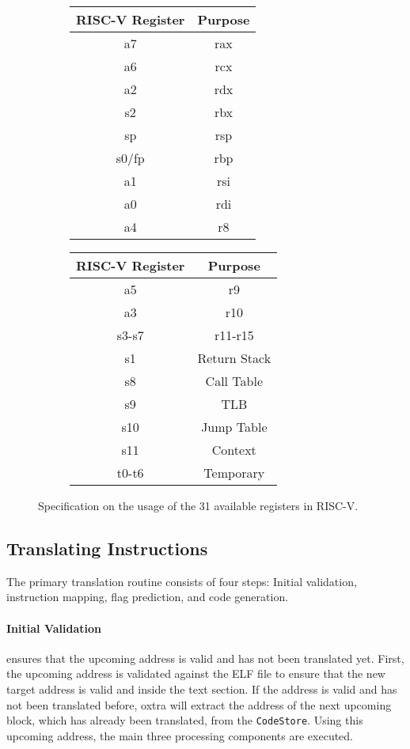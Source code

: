 \begin{figure}[H]
	\centering
	\begin{subfigure}[b]{.5\textwidth}
		\centering
		\begin{tabular}{|c|c|} 
			\hline
			\textbf{RISC-V Register} & \textbf{Purpose}\\
			\hline
			a7 & rax \\
			a6 & rcx\\
			a2 & rdx \\
			s2 & rbx \\
			sp & rsp \\
			s0/fp & rbp \\
			a1 & rsi \\
			a0 & rdi \\
			a4 & r8 \\
			\hline
		\end{tabular}
	\end{subfigure}%
	\begin{subfigure}[b]{.5\textwidth}
		\centering
		\begin{tabular}{|c|c|} 
			\hline
			\textbf{RISC-V Register} & \textbf{Purpose}\\
			\hline
			a5 & r9 \\
			a3 & r10 \\
			s3-s7 & r11-r15 \\
			s1 & Return Stack \\
			s8 & Call Table \\
			s9 & TLB \\
			s10 & Jump Table \\
			s11 & Context \\
			t0-t6 & Temporary \\
			\hline
		\end{tabular}
	\end{subfigure}
	\caption[Register Mapping]{Specification on the usage of the 31 available registers in RISC-V.}
	\label{fig:register-mapping}
\end{figure}

\subsection{Translating Instructions}
	The primary translation routine consists of four steps: Initial validation, instruction mapping, flag prediction, and code generation.
	
	\paragraph{Initial Validation} ensures that the upcoming address is valid and has not been translated yet. First, the upcoming address is validated against the ELF file to ensure that the new target address is valid and inside the text section. If the address is valid and has not been translated before, oxtra will extract the address of the next upcoming block, which has already been translated, from the \texttt{CodeStore}. Using this upcoming address, the main three processing components are executed.
	
